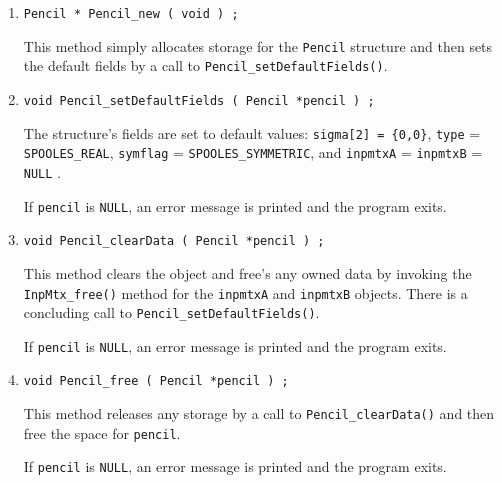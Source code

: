 \begin{enumerate}
\item
\begin{verbatim}
Pencil * Pencil_new ( void ) ;
\end{verbatim}
This method simply allocates storage for the {\tt Pencil} structure 
and then sets the default fields by a call to 
{\tt Pencil\_setDefaultFields()}.
\item
\begin{verbatim}
void Pencil_setDefaultFields ( Pencil *pencil ) ;
\end{verbatim}
The structure's fields are set to default values:
{\tt sigma[2] = \{0,0\}},
{\tt type} = {\tt SPOOLES\_REAL},
{\tt symflag} = {\tt SPOOLES\_SYMMETRIC},
and {\tt inpmtxA} = {\tt inpmtxB} = {\tt NULL} .
\par {}
If {\tt pencil} is {\tt NULL},
an error message is printed and the program exits.
\item
\begin{verbatim}
void Pencil_clearData ( Pencil *pencil ) ;
\end{verbatim}
This method clears the object and free's any owned data
by invoking the {\tt InpMtx\_free()} method for 
the {\tt inpmtxA} and {\tt inpmtxB} objects.
There is a concluding call to {\tt Pencil\_setDefaultFields()}.
\par {}
If {\tt pencil} is {\tt NULL},
an error message is printed and the program exits.
\item
\begin{verbatim}
void Pencil_free ( Pencil *pencil ) ;
\end{verbatim}
This method releases any storage by a call to 
{\tt Pencil\_clearData()} and then free the space for {\tt pencil}.
\par {}
If {\tt pencil} is {\tt NULL},
an error message is printed and the program exits.
\end{enumerate}
\par
